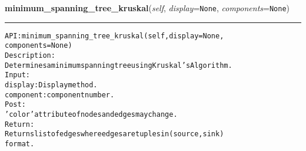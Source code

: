     \label{coinor:gimpy:graph:Graph:minimum_spanning_tree_kruskal}

    \vspace{0.5ex}

\hspace{.8\funcindent}\begin{boxedminipage}{\funcwidth}

    \raggedright \textbf{minimum\_spanning\_tree\_kruskal}(\textit{self}, \textit{display}={\tt None}, \textit{components}={\tt None})

    \vspace{-1.5ex}

    \rule{\textwidth}{0.5\fboxrule}
\setlength{\parskip}{2ex}
\begin{alltt}

API: minimum\_spanning\_tree\_kruskal(self, display = None,
                                   components = None)
Description:
Determines a minimum spanning tree using Kruskal's Algorithm.
Input:
    display: Display method.
    component: component number.
Post:
    'color' attribute of nodes and edges may change.
Return:
    Returns list of edges where edges are tuples in (source,sink)
    format.
\end{alltt}

\setlength{\parskip}{1ex}
    \end{boxedminipage}

    \label{coinor:gimpy:graph:Graph:max_flow_preflowpush}

    \vspace{0.5ex}

